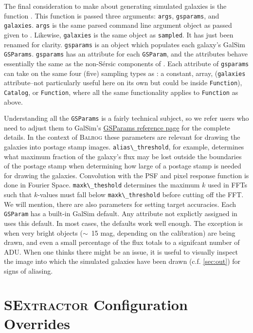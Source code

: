 \documentclass[12pt]{book}
\newcommand{\codett}[1]{\lstinline{#1}}
\newcommand{\galsim}{GalSim}
\newcommand{\balrog}{\textsc{Balrog}}
\newcommand{\sex}{\textsc{SExtractor}}
\newcommand{\sersic}{S\'{e}rsic}
\begin{document}
The final consideration to make about generating simulated galaxies is the function \gspfunc{}.
This function is passed three arguments: \codett{args}, \codett{gsparams}, and \codett{galaxies}.
\codett{args} is the same parsed command line argument object as passed given to \simfunc{}.
Likewise, \codett{galaxies} is the same object as \codett{sampled}.
It has just been renamed for clarity.
\codett{gsparams} is an object which populates each galaxy's \galsim{} \codett{GSParams}.
\codett{gsparams} has an attribute for each \codett{GSParam}, 
and the attributes behave essentially the same as the non-\sersic{} components of \simrules{}.
Each attribute of \codett{gsparams} can take on the same four (five) sampling types as \simrules{}:
a constant, array, (\codett{galaxies} attribute--not particularly useful here on its own but could be
inside \codett{Function}), \codett{Catalog}, or \codett{Function},
where all the same functionality applies to \codett{Function} as above.

Understanding all the \codett{GSParams} is a fairly technical subject, so we
refer users who need to adjust them to 
\galsim{}'s \href{http://galsim-developers.github.io/GalSim/structgalsim\_1\_1\_g\_s\_params.html}{GSParams reference page}
for the complete details.
In the context of \balrog{} these parameters are relevant for drawing the galaxies into postage stamp images.
\codett{alias\_threshold}, for example, determines what maximum fraction of the galaxy's flux may be lost outside the boundaries
of the postage stamp when determining how large of a postage stamp is needed for drawing the galaxies.
Convolution with the PSF and pixel response function is done in Fourier Space.
\codett{maxk\_theshold} determines the maximum $k$ used in FFTs such that $k$-values must fall below \codett{maxk\_threshold}
before cutting off the FFT. We will mention, there are also parameters for setting target accuracies.
Each \codett{GSParam} has a built-in \galsim{} default. Any attribute not explictly
assigned in \gspfunc{} uses this default.
In most cases, the defaults work well enough. The exception is when very bright objects ($\sim$~15 mag, depending on the calibration)
are being drawn, and even a small percentage of the flux totals to a signifcant number of ADU.
When one thinks there might be an issue, 
it is useful to visually inspect the image into which the simulated galaxies have been drawn (c.f. \autoref{sec:out})
for signs of aliasing.


\section{\sex{} Configuration Overrides}
\label{sec:sexoverride}
\end{document}
